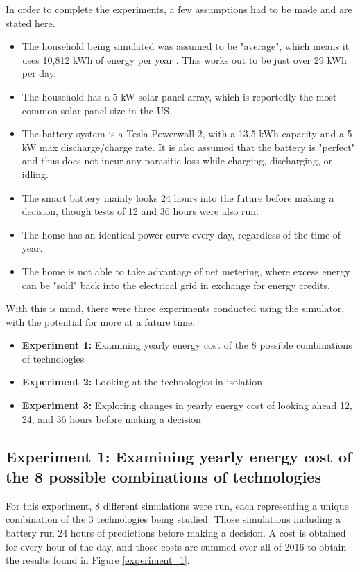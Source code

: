 In order to complete the experiments, a few assumptions had to be made and are stated here.

\begin{itemize}
  \item The household being simulated was assumed to be "average", which means it uses 10,812 kWh of energy per year \cite{noauthor_how_nodate}. This works out to be just over 29 kWh per day.
  \item The household has a 5 kW solar panel array, which is reportedly the most common solar panel size in the US.
  \item The battery system is a Tesla Powerwall 2, with a 13.5 kWh capacity and a 5 kW max discharge/charge rate. It is also assumed that the battery is "perfect" and thus does not incur any parasitic loss while charging, discharging, or idling.
  \item The smart battery mainly looks 24 hours into the future before making a decision, though tests of 12 and 36 hours were also run.
  \item The home has an identical power curve every day, regardless of the time of year.
  \item The home is not able to take advantage of net metering, where excess energy can be "sold" back into the electrical grid in exchange for energy credits.
\end{itemize}

With this is mind, there were three experiments conducted using the simulator, with the potential for more at a future time.

\begin{itemize}
  \item \textbf{Experiment 1:} Examining yearly energy cost of the 8 possible combinations of technologies
  \item \textbf{Experiment 2:} Looking at the technologies in isolation
  \item \textbf{Experiment 3:} Exploring changes in yearly energy cost of looking ahead 12, 24, and 36 hours before making a decision
\end{itemize}

\subsection*{Experiment 1: Examining yearly energy cost of the 8 possible combinations of technologies}

For this experiment, 8 different simulations were run, each representing a unique combination of the 3 technologies being studied. Those simulations including a battery run 24 hours of predictions before making a decision. A cost is obtained for every hour of the day, and those costs are summed over all of 2016 to obtain the results found in Figure \ref{experiment_1}.

